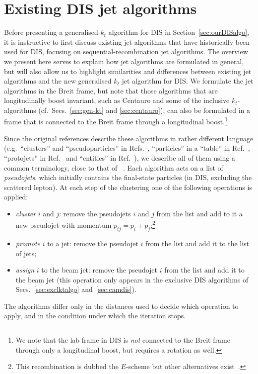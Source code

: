 \section{Existing DIS jet algorithms}
\label{sec:oldDISalgo}
Before presenting a generalised-$k_t$ algorithm for DIS in
Section~\ref{sec:ourDISalgo}, it is instructive to first discuss
existing jet algorithms that have historically been used for DIS,
focusing on sequential-recombination jet algorithms.
%
The overview we present here serves to explain how jet algorithms are formulated in general,
but will also allow us to highlight similarities and differences
between existing jet algorithms and the new generalised $k_t$ jet algorithm for DIS.
%
We formulate the jet algorithms in the Breit frame, but note that
those algorithms that are longitudinally boost invariant, such as
Centauro and some of the inclusive $k_t$-algorithms
(cf.\ Secs.~\ref{sec:gen-kt} and \ref{sec:centauro}), can also be
formulated in a frame that is connected to the Breit frame through a
longitudinal boost.\footnote{We note that the lab frame in DIS is
\emph{not} connected to the Breit frame through only a longitudinal
boost, but requires a rotation as well.}

Since the original references describe these algorithms in rather
different language (e.g.\ ``clusters'' and ``pseudoparticles'' in
Refs.~\cite{Catani:1991hj,Catani:1992zp,Catani:1993hr}, ``particles''
in a ``table'' in Ref.~\cite{Dokshitzer:1997in}, ``protojets'' in
Ref.~\cite{Ellis:1993tq} and ``entities'' in
Ref.~\cite{Cacciari:2008gp}), we describe all of them using a common
terminology, close to that of \FASTJET~\cite{Cacciari:2011ma}.
%
Each algorithm acts on a list of \emph{pseudojets}, which initially
contains the final-state particles (in DIS, excluding the scattered
lepton). At each step of the clustering one of the following
operations is applied:
\begin{itemize}
\item \emph{cluster} $i$ and $j$: remove the pseudojets $i$ and $j$
  from the list and add to it a new pseudojet with momentum
  $p_{ij} = p_i + p_j$;\footnote{This recombination is dubbed the
    $E$-scheme but other alternatives
    exist~\cite{JADE:1986kta,JADE:1988xlj,Catani:1991hj}.}
\item \emph{promote} $i$ to a jet: remove the pseudojet $i$ from the
  list and add it to the list of jets;
\item \emph{assign} $i$ to the beam jet: remove the pseudojet $i$
  from the list and add it to the beam jet (this operation only appears
  in the exclusive DIS algorithms of Secs.~\ref{sec:exclktalgo}
  and~\ref{sec:camdis}).
\end{itemize}
The algorithms differ only in the distances used to decide which
operation to apply, and in the condition under which the iteration
stops.

